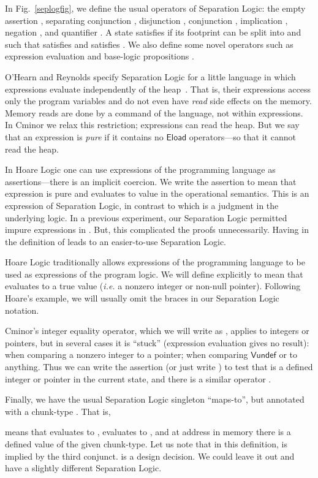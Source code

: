 \documentclass{llncs}
\newcommand{\cminor}{Cminor}
\newcommand{\tyface}[1]{\ensuremath{\mathsf{#1}}}
\newcommand{\Vundef}{\tyface{Vundef}}
\begin{document}
In Fig.~\ref{seplogfig}, we define the usual operators of Separation Logic:
the empty assertion , separating conjunction , 
disjunction , conjunction , implication ,
negation , and quantifier .
A state  satisfies  if its footprint  can be split into  and 
such that  satisfies  and  satisfies .
We also define some novel operators such as
expression evaluation 
and base-logic propositions  .


O'Hearn and Reynolds specify Separation Logic for a little
language in which expressions evaluate independently of the heap~\cite{ohearn01}.
That is, their expressions access only the program variables
and do not even have \emph{read} side effects on the memory.
Memory reads
are done by a command of the language, not within
expressions.  In \cminor{} we relax this restriction; expressions
can read the heap.  But we say that an expression is \emph{pure} if
it contains no \tyface{Eload} operators---so that it cannot read the heap.

In Hoare Logic one can use expressions of the programming language as
assertions---there is an implicit coercion.
We write the assertion  
to mean that
expression  is pure and evaluates to value  in the operational semantics.
This is an expression of Separation Logic, in contrast to 
 which is a judgment in the underlying
logic.
In a previous experiment, our Separation Logic permitted impure expressions
in . But, this complicated the proofs unnecessarily. Having 
 in the definition of 
leads to an easier-to-use Separation Logic.

Hoare Logic traditionally allows expressions  of the programming
language to be used as expressions of the program logic.
We will define explicitly
 to mean that  evaluates to a true value
(\textit{i.e.} a nonzero integer or non-null pointer).
Following Hoare's example, we will usually omit the 
braces in our Separation Logic notation.

\cminor's integer equality operator,
which we will write as ,
applies to integers or pointers, but in several cases it is
``stuck'' (expression evaluation gives no result):
when comparing a nonzero integer to a pointer;
when comparing
\Vundef{} or  to anything.  Thus we can write
the assertion  (or just write ) to test 
that  is a defined integer or pointer in the current state,
and there is a similar operator .

Finally, we have the usual Separation Logic singleton ``maps-to'',
but annotated with a chunk-type .  That is,

means that  evaluates to ,  evaluates to , and
at address  in memory there is a defined value
 of the given chunk-type.
Let us note that in this definition,  is implied by the third conjunct.
 is a design decision. We could leave it out and have a slightly different
Separation Logic.
\end{document}
